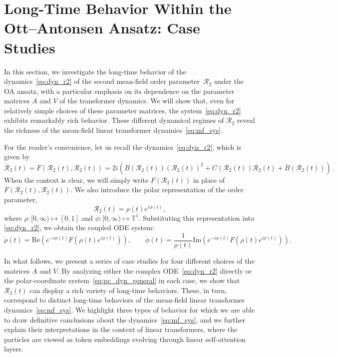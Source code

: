 \documentclass[10pt]{article}
\theoremstyle{definition}
\theoremstyle{definition}
\numberwithin{equation}{section}
\newcommand{\BBT}{\mathbb{T}}
\newcommand{\CR}{\mathcal{R}}
\newcommand{\im}[1]{\mathrm{Im} \left(#1\right)}
\newcommand{\re}[1]{\mathrm{Re}\left(#1\right)}
\newcommand{\Drho}{\Dot{\rho}}
\newcommand{\Dphi}{\Dot{\phi}}
\begin{document}
\section{Long-Time Behavior Within the Ott--Antonsen Ansatz: Case Studies}
\label{sec:case_study}
In this section,
we investigate the long-time behavior of the dynamics~\eqref{eq:dyn_r2} of the second mean-field order parameter~$\CR_2$ under the OA ansatz,
with a particular emphasis on its dependence on the parameter matrices $A$ and $V$ of the transformer dynamics. 
We will show that, even for relatively simple choices of these parameter matrices, the system~\eqref{eq:dyn_r2} exhibits remarkably rich behavior. 
These different dynamical regimes of $\CR_2$ reveal the richness of the mean-field linear transformer dynamics~\eqref{eq:mf_sys}.

For the reader's convenience, let us recall the dynamics~\eqref{eq:dyn_r2}, which is given by
\begin{equation*}
    \Dot{\CR}_2(t) = F(\CR_2(t), \CR_2(t)) = 2i \left( B(\CR_2(t)) (\CR_2(t))^2 + C(\CR_2(t)) \CR_2(t) + \overline{B}(\CR_2(t)) \right) \, .
\end{equation*}
When the context is clear,
we will simply write $F(\CR_2(t))$ in place of $F(\CR_2(t), \CR_2(t))$.
We also introduce the polar representation of the order parameter, 
\begin{equation*}
    \CR_2(t) = \rho(t) e^{i\phi(t)},
\end{equation*}
where $\rho: [0, \infty) \mapsto [0,1]$ and $\phi: [0, \infty) \mapsto \BBT^1$.
Substituting this representation into \eqref{eq:dyn_r2},
we obtain the coupled ODE system:
\begin{equation}\label{eq:pc_dyn_general}
\Drho(t) = \re{e^{-i\phi(t)} F(\rho(t) e^{i\phi(t)})}, \qquad \Dphi(t) = \frac{1}{\rho(t)} \im{e^{-i\phi(t)} F(\rho(t) e^{i\phi(t)})} .
\end{equation}

In what follows, we present a series of case studies for four different choices of the matrices $A$ and $V$.
By analyzing either the complex ODE~\eqref{eq:dyn_r2} directly or the polar-coordinate system~\eqref{eq:pc_dyn_general} in each case, we show that $\CR_2(t)$ can display a rich variety of long-time behaviors.
These, in turn, correspond to distinct long-time behaviors of the mean-field linear transformer dynamics~\eqref{eq:mf_sys}.
We highlight three types of behavior for which we are able to draw definitive conclusions about the dynamics~\eqref{eq:mf_sys}, and we further explain their interpretations in the context of linear transformers, where the particles are viewed as token embeddings evolving through linear self-attention layers.
\end{document}

